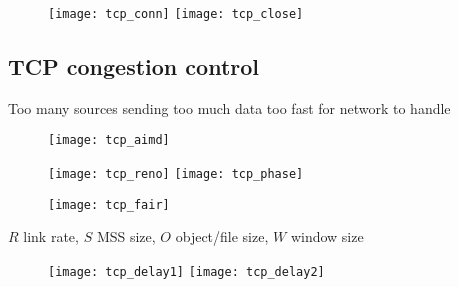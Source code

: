 \begin{figure}[H]
  \centering
  \texttt{[image: tcp\_conn]}
  \texttt{[image: tcp\_close]}
\end{figure}

\subsection{TCP congestion control}

 Too many sources sending too much data too fast for network to handle

\begin{figure}[H]
  \centering
  \texttt{[image: tcp\_aimd]}
\end{figure}

\begin{figure}[H]
  \centering
  \texttt{[image: tcp\_reno]}
  \texttt{[image: tcp\_phase]}
\end{figure}

\begin{figure}[H]
  \centering
  \texttt{[image: tcp\_fair]}
\end{figure}

$R$ link rate, $S$ MSS size, $O$ object/file size, $W$ window size
\begin{figure}[H]
  \centering
  \texttt{[image: tcp\_delay1]}
  \texttt{[image: tcp\_delay2]}
\end{figure}
